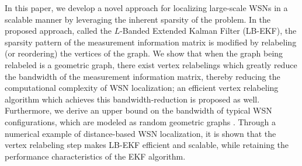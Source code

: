 \documentclass[twocolumn]{article}
\theoremstyle{plain}
\theoremstyle{definition}
\theoremstyle{definition}
\theoremstyle{remark}
\begin{document}
In this paper, we develop a novel approach for localizing large-scale WSNs in a scalable manner by leveraging the inherent sparsity of the problem. 
In the proposed approach, called the $L$-Banded Extended Kalman Filter (LB-EKF),
the sparsity pattern of the measurement information matrix is modified by relabeling (or reordering) the vertices of the graph. We show that when the graph being relabeled is a geometric graph, there exist vertex relabelings which greatly reduce the bandwidth of the measurement information matrix, thereby reducing the computational complexity of WSN localization; an efficient vertex relabeling algorithm which achieves this bandwidth-reduction is proposed as well. 
Furthermore, we derive an upper bound on the bandwidth of typical WSN configurations, which are modeled as random geometric graphs \cite{2010randomWSN}.
Through a numerical example of distance-based WSN localization, it is shown that the vertex relabeling step makes LB-EKF efficient and scalable, while retaining the performance characteristics of the EKF algorithm.
\end{document}
